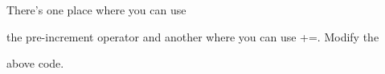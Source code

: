 There's one place where you can use

the pre-increment operator and another where you can use +=. Modify the

above code.

